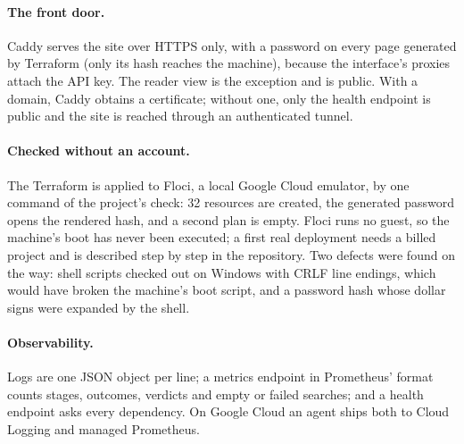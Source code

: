 \paragraph{The front door.} Caddy serves the site over HTTPS only, with
a password on every page generated by Terraform (only its hash reaches
the machine), because the interface's proxies attach the API key. The
reader view is the exception and is public. With a domain, Caddy
obtains a certificate; without one, only the health endpoint is public
and the site is reached through an authenticated tunnel.

\paragraph{Checked without an account.} The Terraform is applied to
Floci, a local Google Cloud emulator, by one command of the project's
check: 32 resources are created, the generated password opens the
rendered hash, and a second plan is empty. Floci runs no guest, so the
machine's boot has never been executed; a first real deployment needs
a billed project and is described step by step in the repository. Two
defects were found on the way: shell scripts checked out on Windows
with CRLF line endings, which would have broken the machine's boot
script, and a password hash whose dollar signs were expanded by the
shell.

\paragraph{Observability.} Logs are one JSON object per line; a
metrics endpoint in Prometheus' format counts stages, outcomes, verdicts
and empty or failed searches; and a health endpoint asks every
dependency. On Google Cloud an agent ships both to Cloud Logging and
managed Prometheus.

